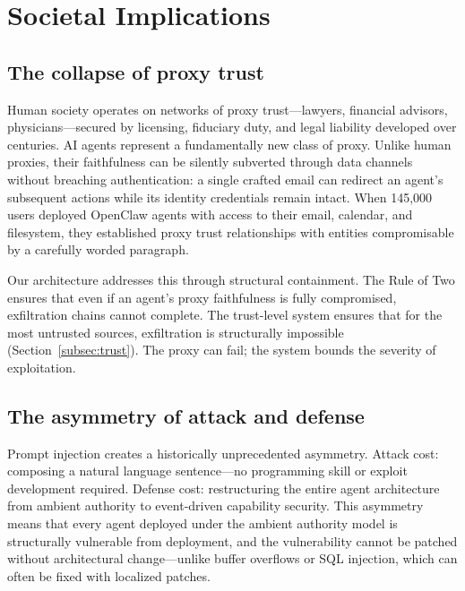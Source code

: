 \documentclass[pdflatex,sn-nature]{sn-jnl}%
\theoremstyle{thmstyleone}%
\theoremstyle{thmstyletwo}%
\theoremstyle{thmstylethree}%
\begin{document}
\section{Societal Implications}\label{sec:society}

\subsection{The collapse of proxy trust}\label{subsec:proxy}

Human society operates on networks of proxy trust---lawyers, financial advisors, physicians---secured by licensing, fiduciary duty, and legal liability developed over centuries. AI agents represent a fundamentally new class of proxy. Unlike human proxies, their faithfulness can be silently subverted through data channels without breaching authentication: a single crafted email can redirect an agent's subsequent actions while its identity credentials remain intact. When 145,000 users deployed OpenClaw agents with access to their email, calendar, and filesystem, they established proxy trust relationships with entities compromisable by a carefully worded paragraph.

Our architecture addresses this through structural containment. The Rule of Two ensures that even if an agent's proxy faithfulness is fully compromised, exfiltration chains cannot complete. The trust-level system ensures that for the most untrusted sources, exfiltration is structurally impossible (Section~\ref{subsec:trust}). The proxy can fail; the system bounds the severity of exploitation.

\subsection{The asymmetry of attack and defense}\label{subsec:asymmetry}

Prompt injection creates a historically unprecedented asymmetry. Attack cost: composing a natural language sentence---no programming skill or exploit development required. Defense cost: restructuring the entire agent architecture from ambient authority to event-driven capability security. This asymmetry means that every agent deployed under the ambient authority model is structurally vulnerable from deployment, and the vulnerability cannot be patched without architectural change---unlike buffer overflows or SQL injection, which can often be fixed with localized patches.
\end{document}
